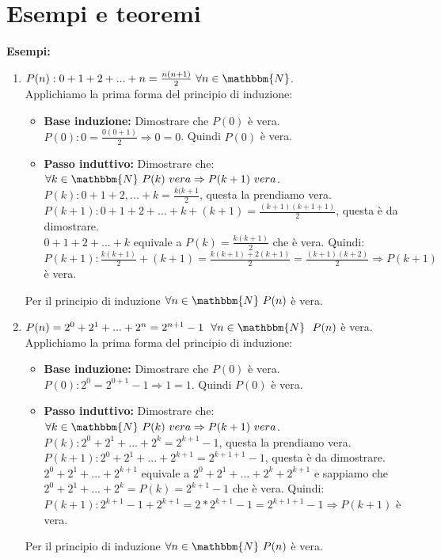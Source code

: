\documentclass[12pt, letterpaper]{report}
\begin{document}
		\section{Esempi e teoremi}
		\textbf{Esempi: }
		\begin{enumerate}
			\item $P(n): 0 + 1 + 2 + ... + n = \frac{n(n + 1)}{2} \ \forall n \in \mathbbm{N}$.\\
			Applichiamo la prima forma del principio di induzione:
			\begin{itemize}
				\item \textbf{Base induzione:} Dimostrare che $P(0)$ è vera.\\
				$P(0): 0 = \frac{0(0 + 1)}{2} \Rightarrow 0 = 0$. Quindi $P(0)$ è vera.
				\item \textbf{Passo induttivo:} Dimostrare che:\\ $\forall k \in \mathbbm{N} \ P(k) \ vera \Rightarrow P(k + 1) \ vera$.\\
				$P(k): 0 + 1 + 2, ... + k = \frac{k(k + 1}{2}$, questa la prendiamo vera.\\
				$P(k + 1): 0 + 1 + 2 + ... + k + (k + 1) = \frac{(k + 1)(k + 1 + 1)}{2}$, questa è da dimostrare.\\
				$0 + 1 + 2 + ... + k$ equivale a $P(k) = \frac{k(k + 1)}{2}$ che è vera. Quindi: \\
				$P(k + 1): \frac{k(k + 1)}{2} + (k + 1) = \frac{k(k + 1) + 2(k + 1)}{2} = \frac{(k + 1)(k + 2)}{2} \Rightarrow P(k + 1)$ è vera.
			\end{itemize}
			Per il principio di induzione $\forall n \in \mathbbm{N} \ P(n)$ è vera.
			\item $P(n) = 2^0 + 2^1 + ... + 2^n = 2^{n + 1} - 1 \ \ \forall n \in \mathbbm{N} \ \ P(n)$ è vera.
			Applichiamo la prima forma del principio di induzione:
			\begin{itemize}
				\item \textbf{Base induzione:} Dimostrare che $P(0)$ è vera.\\
				$P(0): 2^0 = 2^{0 + 1} - 1 \Rightarrow 1 = 1$. Quindi $P(0)$ è vera.
				\item \textbf{Passo induttivo:} Dimostrare che:\\ $\forall k \in \mathbbm{N} \ P(k) \ vera \Rightarrow P(k + 1) \ vera$.\\
				$P(k): 2^0 + 2^1 + ... + 2^k = 2^{k + 1} - 1$, questa la prendiamo vera.\\
				$P(k + 1): 2^0 + 2^1 + ... + 2^{k + 1} = 2^{k + 1 + 1} - 1$, questa è da dimostrare.\\
				$2^0 + 2^1 + ... + 2^{k + 1}$ equivale a $2^0 + 2^1 + ... + 2^k + 2^{k + 1}$ e sappiamo che $2^0 + 2^1 + ... + 2^k = P(k) = 2^{k + 1} - 1$ che è vera. Quindi: \\
				$P(k + 1): 2^{k + 1} - 1 + 2^{k + 1} = 2*2^{k + 1} - 1 = 2^{k + 1 + 1} - 1 \Rightarrow P(k + 1)$ è vera.
			\end{itemize}
			Per il principio di induzione $\forall n \in \mathbbm{N} \ P(n)$ è vera.
 		\end{enumerate}
\end{document}
